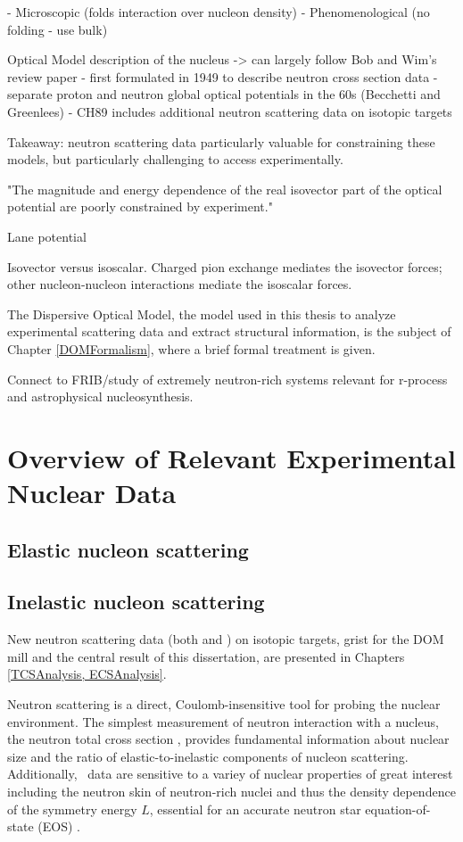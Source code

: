 \begin{eqation}
- Microscopic (folds interaction over nucleon density)
- Phenomenological (no folding - use bulk)

Optical Model description of the nucleus
-> can largely follow Bob and Wim's review paper
- first formulated in 1949 to describe neutron cross section data
- separate proton and neutron global optical potentials in the 60s (Becchetti
and Greenlees)
- CH89 includes additional neutron scattering data on isotopic targets

Takeaway: neutron scattering data particularly valuable for constraining these
models, but particularly challenging to access experimentally.

"The magnitude and energy dependence of the real isovector part of the
optical potential are poorly constrained by experiment." \cite{Holt16}

Lane potential 

Isovector versus isoscalar. Charged pion exchange mediates the isovector forces;
other nucleon-nucleon interactions mediate the isoscalar forces.

The Dispersive Optical Model, the model used in this thesis to analyze experimental scattering data
and extract structural information, is the subject of Chapter \ref{DOMFormalism}, where a brief
formal treatment is given.

Connect to FRIB/study of extremely neutron-rich systems relevant for r-process
and astrophysical nucleosynthesis.

\section{Overview of Relevant Experimental Nuclear Data}
\subsection{Elastic nucleon scattering}
\subsection{Inelastic nucleon scattering}

New neutron scattering data (both \tot and \el) on isotopic targets, grist for the DOM mill and the 
central result of this dissertation, are presented in Chapters \ref{TCSAnalysis, ECSAnalysis}.

Neutron scattering is a direct, Coulomb-insensitive tool for probing the nuclear
environment. The simplest measurement of neutron interaction with a nucleus,
the neutron total cross section \tot, provides fundamental information about
nuclear size and the ratio of elastic-to-inelastic components of nucleon 
scattering. Additionally, \tot\ data are sensitive to a variey of nuclear
properties of great interest including the neutron skin of neutron-rich nuclei
\cite{Mahzoon2017} and thus the density dependence of the symmetry energy $L$,
essential for an accurate neutron star equation-of-state (EOS)
\cite{Fattoyev2012, Vinas2014, Brown2000}.


\end{eqation}
